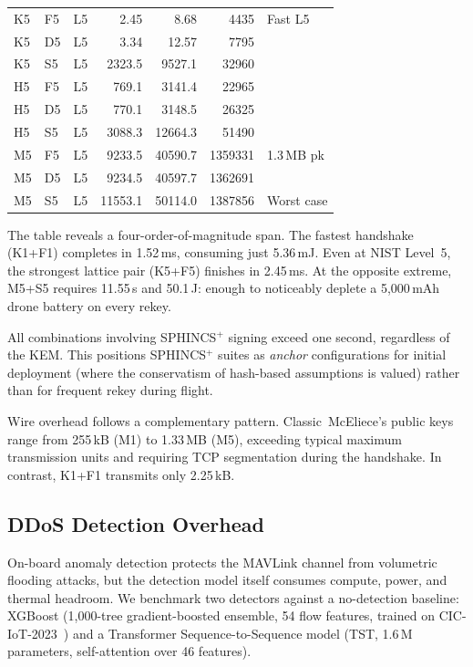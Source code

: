 \documentclass[conference]{IEEEtran}
\begin{document}
\begin{table}[t]
\begin{tabular}{@{}l l c  r r r  l@{}}
\midrule
\rowcolor{bestcell}
K5 & F5 & L5 & 2.45 & 8.68 & 4435 & Fast L5 \\
\rowcolor{bestcell}
K5 & D5 & L5 & 3.34 & 12.57 & 7795 & \\
K5 & S5 & L5 & \cellcolor{worstcell}2323.5 & 9527.1 & 32960 & \\
H5 & F5 & L5 & 769.1 & 3141.4 & 22965 & \\
H5 & D5 & L5 & 770.1 & 3148.5 & 26325 & \\
H5 & S5 & L5 & \cellcolor{worstcell}3088.3 & 12664.3 & 51490 & \\
M5 & F5 & L5 & 9233.5 & 40590.7 & 1359331 & \cellcolor{worstcell}1.3\,MB pk \\
M5 & D5 & L5 & 9234.5 & 40597.7 & 1362691 & \\
M5 & S5 & L5 & \cellcolor{worstcell}11553.1 & 50114.0 & 1387856 & Worst case \\
\bottomrule
\end{tabular}
\end{table}

The table reveals a four-order-of-magnitude span.  The fastest
handshake (K1+F1) completes in 1.52\,ms, consuming just 5.36\,mJ.
Even at NIST Level~5, the strongest lattice pair (K5+F5) finishes in
2.45\,ms.  At the opposite extreme, M5+S5 requires 11.55\,s and
50.1\,J: enough to noticeably deplete a 5{,}000\,mAh drone battery
on every rekey.

All combinations involving SPHINCS$^+$ signing exceed one second,
regardless of the KEM.  This positions SPHINCS$^+$ suites as
\emph{anchor} configurations for initial deployment (where the
conservatism of hash-based assumptions is valued) rather than for
frequent rekey during flight.

Wire overhead follows a complementary pattern.  Classic~McEliece's
public keys range from 255\,kB (M1) to 1.33\,MB (M5), exceeding
typical maximum transmission units and requiring TCP segmentation
during the handshake.  In contrast, K1+F1 transmits only 2.25\,kB.


\subsection{DDoS Detection Overhead}
\label{sec:ddos}

On-board anomaly detection protects the MAVLink channel from
volumetric flooding attacks, but the detection model itself consumes
compute, power, and thermal headroom.  We benchmark two detectors
against a no-detection baseline:
XGBoost (1{,}000-tree gradient-boosted ensemble, 54 flow features,
trained on CIC-IoT-2023~\cite{drone-security-survey}) and a
Transformer Sequence-to-Sequence model (TST, 1.6\,M parameters,
self-attention over 46 features).
\end{document}
